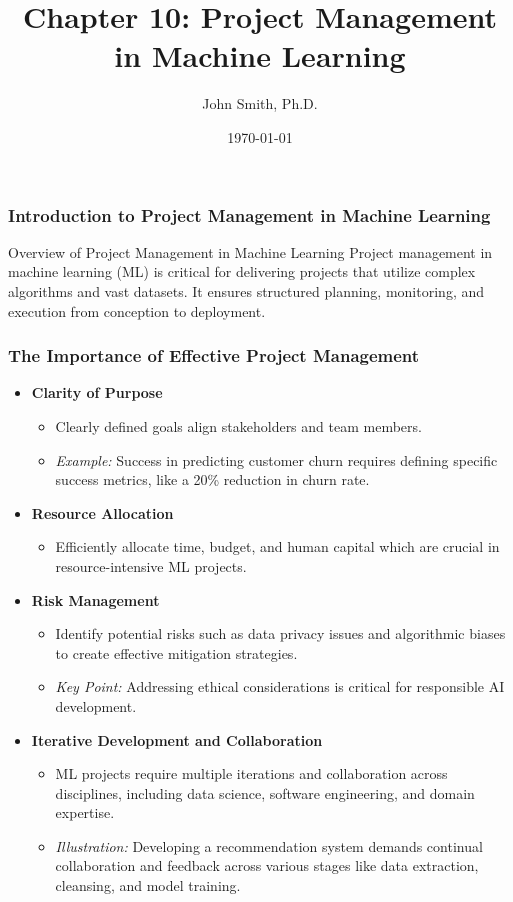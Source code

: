 \documentclass[aspectratio=169]{beamer}
\title[Project Management in ML]{Chapter 10: Project Management in Machine Learning}
\author[J. Smith]{John Smith, Ph.D.}
\institute[University Name]{
  Department of Computer Science\\
  University Name\\
  \vspace{0.3cm}
  Email: email@university.edu\\
  Website: www.university.edu
}
\date{\today}
\begin{document}
\frame{\titlepage}

\begin{frame}[fragile]
    \frametitle{Introduction to Project Management in Machine Learning}
    \begin{block}{Overview of Project Management in Machine Learning}
        Project management in machine learning (ML) is critical for delivering projects that utilize complex algorithms and vast datasets. It ensures structured planning, monitoring, and execution from conception to deployment.
    \end{block}
\end{frame}

\begin{frame}[fragile]
    \frametitle{The Importance of Effective Project Management}
    \begin{itemize}
        \item \textbf{Clarity of Purpose}
        \begin{itemize}
            \item Clearly defined goals align stakeholders and team members.
            \item \textit{Example:} Success in predicting customer churn requires defining specific success metrics, like a 20\% reduction in churn rate.
        \end{itemize}

        \item \textbf{Resource Allocation}
        \begin{itemize}
            \item Efficiently allocate time, budget, and human capital which are crucial in resource-intensive ML projects.
        \end{itemize}

        \item \textbf{Risk Management}
        \begin{itemize}
            \item Identify potential risks such as data privacy issues and algorithmic biases to create effective mitigation strategies.
            \item \textit{Key Point:} Addressing ethical considerations is critical for responsible AI development.
        \end{itemize}

        \item \textbf{Iterative Development and Collaboration}
        \begin{itemize}
            \item ML projects require multiple iterations and collaboration across disciplines, including data science, software engineering, and domain expertise.
            \item \textit{Illustration:} Developing a recommendation system demands continual collaboration and feedback across various stages like data extraction, cleansing, and model training.
        \end{itemize}
    \end{itemize}
\end{frame}
\end{document}
